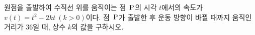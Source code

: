원점을 출발하여 수직선 위를 움직이는 점~$\mathrm{P}$의 시각 $t$에서의 속도가 $v(t)=t^2-2kt\ (k>0)$이다. 점~$\mathrm{P}$가 출발한 후 운동 방향이 바뀔 때까지 움직인 거리가 $36$일 때, 상수 $k$의 값을 구하시오.
